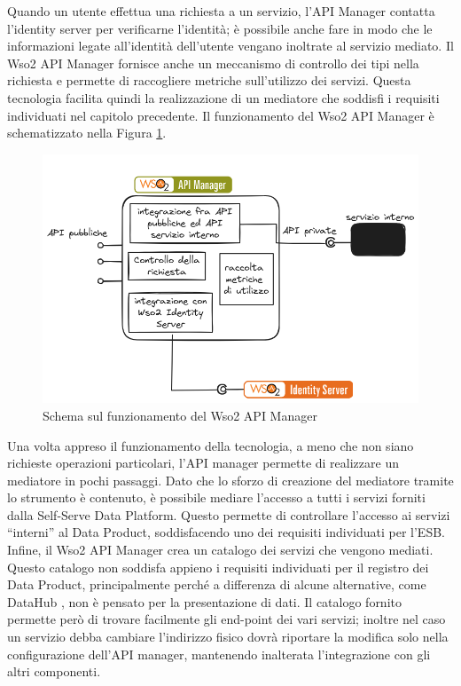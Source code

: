 \documentclass[a4paper,12pt]{report}
\begin{document}
Quando un utente effettua una richiesta a un servizio, l'API Manager contatta l'identity server per verificarne l'identità; è possibile anche fare in modo che le informazioni legate all'identità dell'utente vengano inoltrate al servizio mediato.
Il Wso2 API Manager fornisce anche un meccanismo di controllo dei tipi nella richiesta e permette di raccogliere metriche sull'utilizzo dei servizi. 
Questa tecnologia facilita quindi la realizzazione di un mediatore che soddisfi i requisiti individuati nel capitolo precedente.
Il funzionamento del Wso2 API Manager è schematizzato nella Figura \ref{funzionamento_api_manager}.
\begin{figure}[H]
    \centering
    \includegraphics[width=\linewidth]{immagini/wso2 apim schema.png}
    \caption{Schema sul funzionamento del Wso2 API Manager}
    \label{funzionamento_api_manager}
\end{figure}
Una volta appreso il funzionamento della tecnologia, a meno che non siano richieste operazioni particolari, l'API manager permette di realizzare un mediatore in pochi passaggi.
Dato che lo sforzo di creazione del mediatore tramite lo strumento è contenuto, è possibile mediare l'accesso a tutti i servizi forniti dalla Self-Serve Data Platform.
Questo permette di controllare l'accesso ai servizi ``interni'' al Data Product, soddisfacendo uno dei requisiti individuati per l'ESB.
Infine, il Wso2 API Manager crea un catalogo dei servizi che vengono mediati. 
Questo catalogo non soddisfa appieno i requisiti individuati per il registro dei Data Product, principalmente perché a differenza di alcune alternative, come DataHub \cite{dataHub}, non è pensato per la presentazione di dati.
Il catalogo fornito permette però di trovare facilmente gli end-point dei vari servizi; inoltre nel caso un servizio debba cambiare l'indirizzo fisico dovrà riportare la modifica solo nella configurazione dell'API manager, mantenendo inalterata l'integrazione con gli altri componenti.
\end{document}
